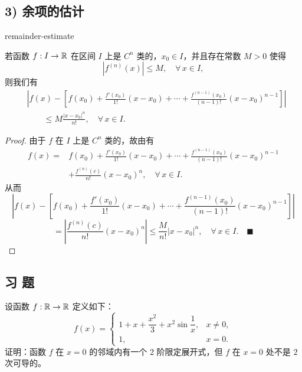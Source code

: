 \subsection*{3) 余项的估计}

\begin{mythm}{}{remainder-estimate}

若函数 $f:I\to\mathbb{R}$ 在区间 $I$ 上是 $C^n$ 类的，$x_0\in I$，并且存在常数 $M>0$ 使得
\[|f^{(n)}(x)|\leqslant M,\quad\forall\,x\in I,\]
则我们有
\[\begin{aligned}
&\left|f(x)-\left[f(x_0)+\frac{f'(x_0)}{1!}(x-x_0)+\cdots+\frac{f^{(n-1)}(x_0)}{(n-1)!}(x-x_0)^{n-1}\right]\right|\\
&\qquad\leqslant M\frac{|x-x_0|^n}{n!},\quad\forall\,x\in I.
\end{aligned}\]

\end{mythm}

\begin{proof}

由于 $f$ 在 $I$ 上是 $C^n$ 类的，故由有
\[\begin{aligned}
f(x)={}&f(x_0)+\frac{f'(x_0)}{1!}(x-x_0)+\cdots+\frac{f^{(n-1)}(x_0)}{(n-1)!}(x-x_0)^{n-1}\\
&+\frac{f^{(n)}(c)}{n!}(x-x_0)^n,\quad\forall\,x\in I.
\end{aligned}\]
从而
\[\left|f(x)-\left[f(x_0)+\frac{f'(x_0)}{1!}(x-x_0)+\cdots+\frac{f^{(n-1)}(x_0)}{(n-1)!}(x-x_0)^{n-1}\right]\right|\]
\[=\left|\frac{f^{(n)}(c)}{n!}(x-x_0)^n\right|\leqslant\frac{M}{n!}|x-x_0|^n,\quad\forall\,x\in I.\quad\blacksquare\]

\end{proof}

\subsection*{习 题}

\begin{exercise}
	\item 设函数 $f:\mathbb{R}\to\mathbb{R}$ 定义如下：
	\[f(x)=\begin{cases} 1+x+\dfrac{x^2}{3}+x^2\sin\dfrac1x, & x\neq0,\\[1ex] 1, & x=0. \end{cases}\]
	证明：函数 $f$ 在 $x=0$ 的邻域内有一个 $2$ 阶限定展开式，但 $f$ 在 $x=0$ 处不是 $2$ 次可导的。
\end{exercise}

